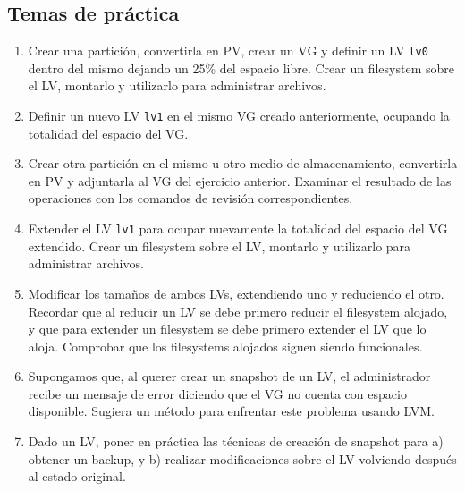 \subsection{Temas de práctica}
\begin{enumerate}
	\item Crear una partición, convertirla en PV, crear un VG y definir un LV \lstinline$lv0$ dentro del mismo dejando un 25\% del espacio libre. Crear un filesystem sobre el LV, montarlo y utilizarlo para administrar archivos.
	\item Definir un nuevo LV \lstinline$lv1$ en el mismo VG creado anteriormente, ocupando la totalidad del espacio del VG.
	\item Crear otra partición en el mismo u otro medio de almacenamiento, convertirla en PV y adjuntarla al VG del ejercicio anterior. Examinar el resultado de las operaciones con los comandos de revisión correspondientes. 
	\item Extender el LV \lstinline$lv1$ para ocupar nuevamente la totalidad del espacio del VG extendido. Crear un filesystem sobre el LV, montarlo y utilizarlo para administrar archivos.
	\item Modificar los tamaños de ambos LVs, extendiendo uno y reduciendo el otro. Recordar que al reducir un LV se debe primero reducir el filesystem alojado, y que para extender un filesystem se debe primero extender el LV que lo aloja. Comprobar que los filesystems alojados siguen siendo funcionales.
	\item Supongamos que, al querer crear un snapshot de un LV, el administrador recibe un mensaje de error diciendo que el VG no cuenta con espacio disponible. Sugiera un método para enfrentar este problema usando LVM.
	\item Dado un LV, poner en práctica las técnicas de creación de snapshot para a) obtener un backup, y b) realizar modificaciones sobre el LV volviendo después al estado original.  
\end{enumerate}
